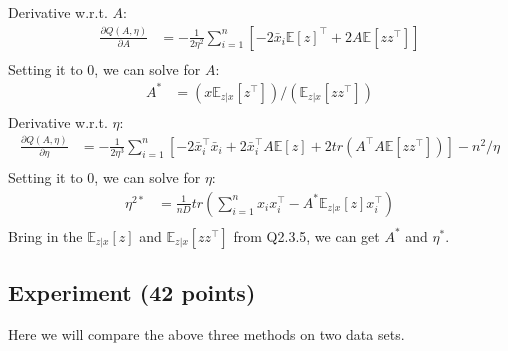 \begin{enumerate}
\begin{soln}
  Derivative w.r.t. $A$:
  \begin{align*}
    \frac{\partial Q(A, \eta)}{\partial A} &= -\frac{1}{2 \eta^2} \sum_{i=1}^n \left[ -2 \bar{x}_i \mathbb{E}[z]^\top + 2 A \mathbb{E}[z z^\top] \right] \\
  \end{align*}
  Setting it to $0$, we can solve for $A$:
  \begin{align*}
    A^* &= (x \mathbb{E}_{z|x}[z^\top]) / ( \mathbb{E}_{z|x}[z z^\top]) \\
  \end{align*}
  Derivative w.r.t. $\eta$:
  \begin{align*}
    \frac{\partial Q(A, \eta)}{\partial \eta} &= -\frac{1}{2 \eta^3} \sum_{i=1}^n \left[ -2 \bar{x}_i^\top \bar{x}_i + 2 \bar{x}_i^\top A \mathbb{E}[z] + 2 tr(A^\top A \mathbb{E}[z z^\top])  \right] - n^2 / \eta \\
  \end{align*}
  Setting it to $0$, we can solve for $\eta$:
  \begin{align*}
    \eta^{2*} &= \frac{1}{nD} tr(\sum_{i=1}^n x_ix_i^\top - A^* \mathbb{E}_{z|x}[z] x_i^\top) \\
  \end{align*}
  Bring in the $\mathbb{E}_{z|x}[z]$ and $\mathbb{E}_{z|x}[z z^\top]$ from Q2.3.5, we can get $A^*$ and $\eta^*$.
\end{soln}

\end{enumerate}

 
\subsection{Experiment (42 points)}

Here we will compare the above three methods on two data sets. 

